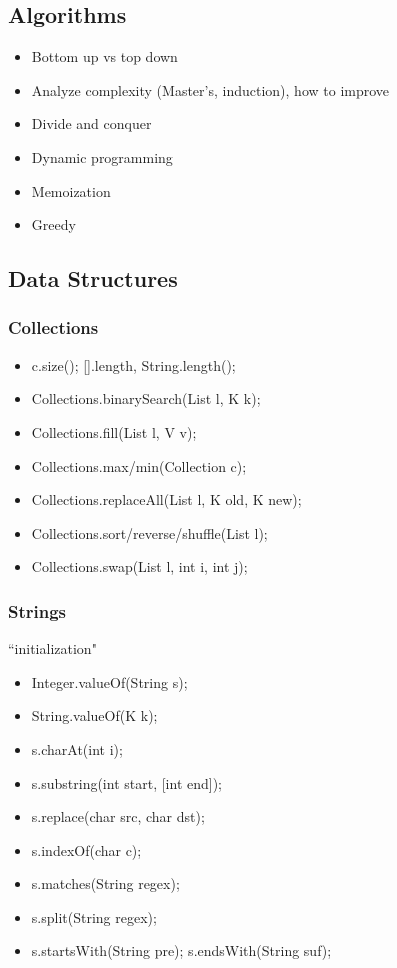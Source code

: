 \documentclass[10pt]{article}
\begin{document}
\subsection{Algorithms}
\begin{itemize}
    \item Bottom up vs top down
    \item Analyze complexity (Master's, induction), how to improve
    \item Divide and conquer
    \item Dynamic programming
    \item Memoization
    \item Greedy
\end{itemize}

\subsection{Data Structures}
\subsubsection{Collections}
\begin{itemize}
    \item c.size(); [].length, String.length();
    \item Collections.binarySearch(List l, K k);
    \item Collections.fill(List l, V v);
    \item Collections.max/min(Collection c);
    \item Collections.replaceAll(List l, K old, K new);
    \item Collections.sort/reverse/shuffle(List l);
    \item Collections.swap(List l, int i, int j);
\end{itemize}
\subsubsection{Strings}
``initialization"
\begin{itemize}
    \item Integer.valueOf(String s);
    \item String.valueOf(K k);
    \item s.charAt(int i);
    \item s.substring(int start, [int end]);
    \item s.replace(char src, char dst);
    \item s.indexOf(char c);
    \item s.matches(String regex);
    \item s.split(String regex);
    \item s.startsWith(String pre); s.endsWith(String suf);
\end{itemize}
\end{document}
